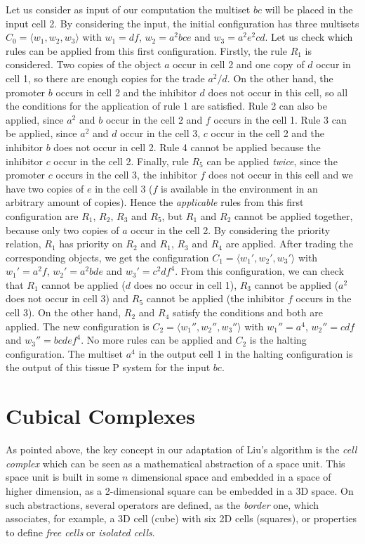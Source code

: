 \documentclass[journal]{IEEEtran}
\begin{document}
Let us consider as input of our computation the multiset $bc$ will
be placed in the input cell 2. By considering the input, the initial
configuration has three multisets $C_0=\langle w_1,w_2,w_3\rangle$
with $w_1=df$, $w_2=a^2bce$ and $w_3=a^2e^2cd$. Let us check which
rules can be applied from this first configuration. Firstly, the
rule $R_1$ is considered. Two copies of the object $a$ occur in cell
2 and one copy of $d$ occur in cell 1, so there are enough copies
for the trade $a^2/d$. On the other hand, the promoter $b$ occurs in
cell 2 and the inhibitor $d$ does not occur in this cell, so all the
conditions for the application of rule 1 are satisfied. Rule 2 can
also be applied, since $a^2$ and $b$ occur in the cell 2 and $f$
occurs in the cell 1. Rule 3 can be applied, since $a^2$ and $d$
occur in the cell 3, $c$ occur in the cell 2 and the inhibitor $b$
does not occur in cell 2. Rule 4 cannot be applied because the
inhibitor $c$ occur in the cell 2. Finally, rule $R_5$ can be
applied {\it twice}, since the promoter $c$ occurs in the cell 3,
the inhibitor $f$ does not occur in this cell and we have two copies
of $e$ in the cell 3 ($f$ is available in the environment in an
arbitrary amount of copies). Hence the {\it applicable} rules from
this first configuration are $R_1$, $R_2$, $R_3$ and $R_5$, but
$R_1$ and $R_2$ cannot be applied together, because only two copies
of $a$ occur in the cell 2. By considering the priority relation,
$R_1$ has priority on $R_2$ and $R_1$, $R_3$ and $R_4$ are applied.
After trading the corresponding objects, we get the configuration
$C_1=\langle w_1',w_2',w_3'\rangle$ with $w_1'=a^2f$, $w_2'=a^2bde$
and $w_3'=c^2df^4$. From this configuration, we can check that $R_1$
cannot be applied ($d$ does no occur in cell 1), $R_3$ cannot be
applied ($a^2$ does not occur in cell 3) and $R_5$ cannot be applied
(the inhibitor $f$ occurs in the cell 3). On the other hand, $R_2$
and $R_4$ satisfy the conditions and both are applied. The new
configuration is $C_2=\langle w_1'',w_2'',w_3''\rangle$ with
$w_1''=a^4$, $w_2''=cdf$ and $w_3''=bcdef^4$. No more rules can be
applied and $C_2$ is the halting configuration. The multiset $a^4$
in the output cell 1 in the halting configuration is the output of
this tissue P system for the input $bc$.

\section{Cubical Complexes}\label{sec:CC}
As pointed above, the key concept in our adaptation of Liu's
algorithm is the {\it cell complex} which can be seen as a
mathematical abstraction of a space unit. This space unit is built
in some $n$ dimensional space and embedded in a space of higher
dimension, as a 2-dimensional square can be embedded in a 3D space.
On such abstractions, several operators are defined, as the
\emph{border} one, which associates, for example, a 3D cell (cube)
with six 2D cells (squares), or properties to define \emph{free
cells} or \emph{isolated cells}.
\end{document}
